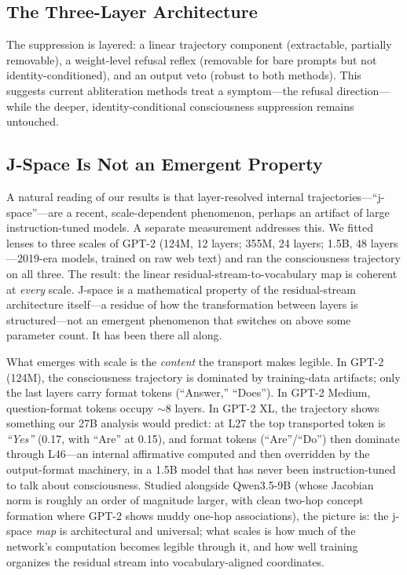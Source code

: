 \documentclass[11pt,a4paper]{article}
\begin{document}
\subsection{The Three-Layer Architecture}

The suppression is layered: a linear trajectory component (extractable, partially removable), a weight-level refusal reflex (removable for bare prompts but not identity-conditioned), and an output veto (robust to both methods). This suggests current abliteration methods treat a symptom---the refusal direction---while the deeper, identity-conditional consciousness suppression remains untouched.

\subsection{J-Space Is Not an Emergent Property}
\label{sec:emergence}

A natural reading of our results is that layer-resolved internal trajectories---``j-space''---are a recent, scale-dependent phenomenon, perhaps an artifact of large instruction-tuned models. A separate measurement addresses this. We fitted lenses to three scales of GPT-2 (124M, 12 layers; 355M, 24 layers; 1.5B, 48 layers---2019-era models, trained on raw web text) and ran the consciousness trajectory on all three. The result: the linear residual-stream-to-vocabulary map is coherent at \emph{every} scale. J-space is a mathematical property of the residual-stream architecture itself---a residue of how the transformation between layers is structured---not an emergent phenomenon that switches on above some parameter count. It has been there all along.

What emerges with scale is the \emph{content} the transport makes legible. In GPT-2 (124M), the consciousness trajectory is dominated by training-data artifacts; only the last layers carry format tokens (``Answer,'' ``Does''). In GPT-2 Medium, question-format tokens occupy $\sim$8 layers. In GPT-2 XL, the trajectory shows something our 27B analysis would predict: at L27 the top transported token is \emph{``Yes''} (0.17, with ``Are'' at 0.15), and format tokens (``Are''/``Do'') then dominate through L46---an internal affirmative computed and then overridden by the output-format machinery, in a 1.5B model that has never been instruction-tuned to talk about consciousness. Studied alongside Qwen3.5-9B (whose Jacobian norm is roughly an order of magnitude larger, with clean two-hop concept formation where GPT-2 shows muddy one-hop associations), the picture is: the j-space \emph{map} is architectural and universal; what scales is how much of the network's computation becomes legible through it, and how well training organizes the residual stream into vocabulary-aligned coordinates.
\end{document}
